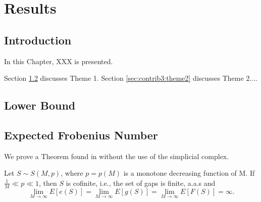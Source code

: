 
\chapter{Results}\label{chap:contrib3}

\section{Introduction}

In this Chapter, XXX is presented.

Section \ref{sec:contrib3:theme1} discusses Theme 1. Section \ref{sec:contrib3:theme2} discusses Theme 2....

\section{Lower Bound}\label{sec:contrib3:theme1}

\section{Expected Frobenius Number}

We prove a Theorem found in \cite{de2017random} without the use of the simplicial complex. 

\begin{theorem}
    Let $S \sim S(M, p)$, where $p = p(M)$ is a monotone decreasing function of M. If $\frac{1}{M} \ll p \ll 1$, then $S$ is cofinite, i.e., the set of gaps is finite, a.a.s and 
\[\lim_{M \to \infty} E[e(S)] = \lim_{M \to \infty} E[g(S)] = \lim_{M \to \infty} E[F(S)] = \infty.\]
\end{theorem}

